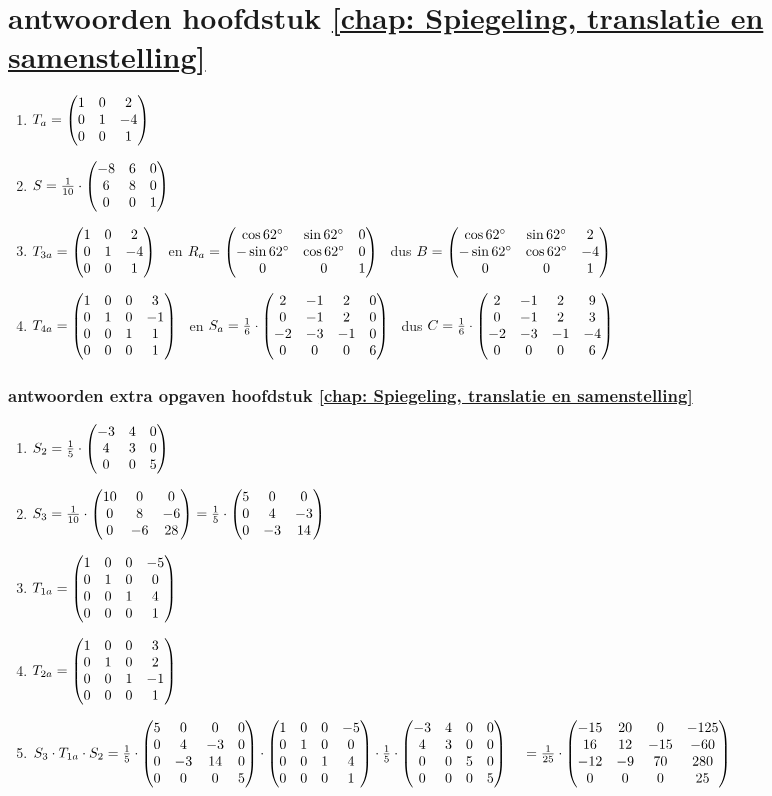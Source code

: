 \section{antwoorden  hoofdstuk \ref{chap: Spiegeling, translatie en samenstelling}}
\begin{enumerate}
	\item $ T_a = \begin{pmatrix} 1&0&2 \\ 0&1&-4 \\ 0&0&1 \end{pmatrix} $ 
	
	\item $   S = \frac{1}{10} \cdot\begin{pmatrix} -8&6&0 \\ 6&8&0 \\ 0&0&1 \end{pmatrix}  $ 
	
	\item $ T_{3a} = \begin{pmatrix} 1&0&2 \\ 0&1&-4 \\ 0&0&1 \end{pmatrix} $ 
	\ en $ R_a= \begin{pmatrix} \cos 62 \degree &\sin 62 \degree&0 \\ -\sin 62 \degree&\cos 62 \degree&0 \\ 0&0&1 \end{pmatrix} $ 
	\ dus $ B= \begin{pmatrix} \cos 62 \degree &\sin 62 \degree&2 \\ -\sin 62 \degree&\cos 62 \degree&-4 \\ 0&0&1 \end{pmatrix} $ 
	
	
	\item $ T_{4a} = \begin{pmatrix} 1&0&0&3 \\ 0&1&0&-1 \\ 0&0&1&1 \\ 0&0&0&1 \end{pmatrix} $
	\ en $ S_a= \frac{1}{6}\cdot\begin{pmatrix} 2&-1&2&0 \\ 0&-1&2&0 \\ -2&-3&-1&0 \\ 0&0&0&6 \end{pmatrix} $
	\ dus $ C = \frac{1}{6}\cdot \begin{pmatrix} 2&-1&2&9 \\ 0&-1&2&3 \\ -2&-3&-1&-4 \\ 0&0&0&6 \end{pmatrix} $
	
	
\end{enumerate}

\subsubsection{antwoorden extra opgaven hoofdstuk \ref{chap: Spiegeling, translatie en samenstelling}}
\begin{enumerate}
	\item $   S_2 = \frac{1}{5} \cdot\begin{pmatrix} -3&4&0 \\ 4&3&0 \\ 0&0&5 \end{pmatrix}  $ 
	\item $   S_3 = \frac{1}{10} \cdot\begin{pmatrix} 10&0&0 \\ 0&8&-6 \\ 0&-6&28 \end{pmatrix}  
	= \frac{1}{5} \cdot \begin{pmatrix} 5&0&0 \\ 0&4&-3 \\ 0&-3&14 \end{pmatrix}  $ 
	
	\item $ T_{1a} = \begin{pmatrix} 1&0&0&-5 \\ 0&1&0&0 \\ 0&0&1&4 \\ 0&0&0&1 \end{pmatrix} $
	\item $ T_{2a} = \begin{pmatrix} 1&0&0&3 \\ 0&1&0&2 \\ 0&0&1&-1 \\ 0&0&0&1 \end{pmatrix} $
	\item $ S_3 \cdot T_{1a} \cdot S_2 = \frac{1}{5} \cdot\begin{pmatrix} 5&0&0&0 \\ 0&4&-3&0 \\ 0&-3&14&0 \\ 0&0&0&5 \end{pmatrix} \cdot 
	\begin{pmatrix} 1&0&0&-5 \\ 0&1&0&0 \\ 0&0&1&4 \\ 0&0&0&1 \end{pmatrix} \cdot 
	\frac{1}{5} \cdot	\begin{pmatrix} -3&4&0&0 \\ 4&3&0&0 \\ 0&0&5&0 \\ 0&0&0&5 \end{pmatrix} \\
	\quad	= \frac{1}{25} \cdot	\begin{pmatrix} -15&20&0&-125 \\ 16&12&-15&-60 \\ -12&-9&70&280 \\ 0&0&0&25 \end{pmatrix} 
	$
	
\end{enumerate}

